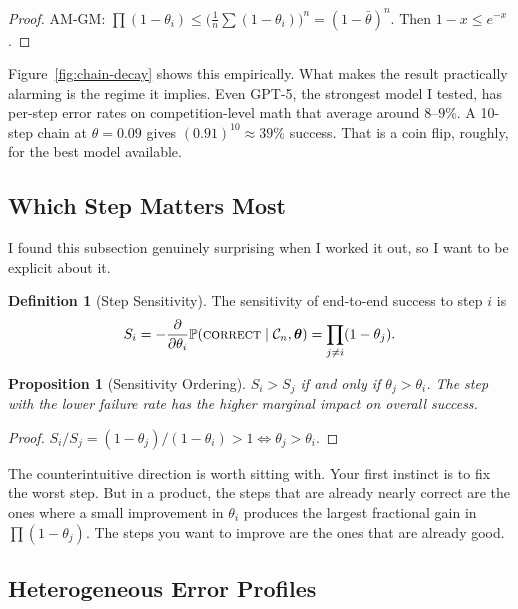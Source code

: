 \documentclass[11pt]{article}
\theoremstyle{plain}
\newtheorem{proposition}[theorem]{Proposition}
\theoremstyle{definition}
\newtheorem{definition}[theorem]{Definition}
\newcommand{\Prob}{\mathbb{P}}
\newcommand{\chain}{\mathcal{C}}
\newcommand{\thetavec}{\bm{\theta}}
\newcommand{\correct}{\textsc{correct}}
\begin{document}
\begin{proof}
  AM-GM: $\prod(1-\theta_i) \leq \bigl(\frac{1}{n}\sum(1-\theta_i)\bigr)^n =
  (1-\bar\theta)^n$. Then $1-x \leq e^{-x}$.
\end{proof}

Figure~\ref{fig:chain-decay} shows this empirically. What makes the result
practically alarming is the regime it implies. Even GPT-5, the strongest model
I tested, has per-step error rates on competition-level math that average
around $8$--$9\%$. A 10-step chain at $\theta = 0.09$ gives $(0.91)^{10}
\approx 39\%$ success. That is a coin flip, roughly, for the best model
available.

\subsection{Which Step Matters Most}

I found this subsection genuinely surprising when I worked it out, so I want
to be explicit about it.

\begin{definition}[Step Sensitivity]\label{def:sensitivity}
  The sensitivity of end-to-end success to step $i$ is
  \[
    S_i = -\frac{\partial}{\partial\theta_i}\Prob(\correct \mid \chain_n, \thetavec)
        = \prod_{j \neq i}(1-\theta_j).
  \]
\end{definition}

\begin{proposition}[Sensitivity Ordering]\label{prop:sensitivity}
  $S_i > S_j$ if and only if $\theta_j > \theta_i$. The step with the
  \emph{lower} failure rate has the higher marginal impact on overall success.
\end{proposition}

\begin{proof}
  $S_i/S_j = (1-\theta_j)/(1-\theta_i) > 1 \Leftrightarrow \theta_j > \theta_i$.
\end{proof}

The counterintuitive direction is worth sitting with. Your first instinct is
to fix the worst step. But in a product, the steps that are already nearly
correct are the ones where a small improvement in $\theta_i$ produces the
largest fractional gain in $\prod(1-\theta_j)$. The steps you want to improve
are the ones that are already good.

\subsection{Heterogeneous Error Profiles}
\end{document}
